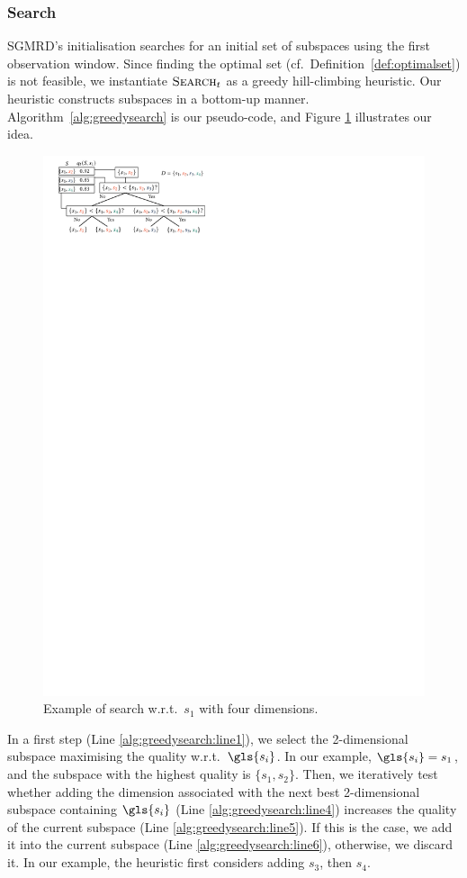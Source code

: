\subsubsection{Search}

{SGMRD}'s initialisation searches for an initial set of subspaces using the first observation window. Since finding the optimal set (cf.\ Definition~\ref{def:optimalset}) is not feasible, we instantiate $\textsc{Search}_t$ as a greedy hill-climbing heuristic. Our heuristic constructs subspaces in a bottom-up manner. 
Algorithm~\ref{alg:greedysearch} is our pseudo-code, and Figure \ref{fig:SGMRD_gmd} illustrates our idea.%

\begin{figure}
	\centering
	\includegraphics[width=0.7\linewidth]{part4-figures/SGMRD_gmd-compressed.pdf}
	\caption{Example of search w.r.t.\ $s_1$ with four dimensions.} 
	\label{fig:SGMRD_gmd}
\end{figure} 

In a first step (Line \ref{alg:greedysearch:line1}), we select the 2-dimensional subspace maximising the quality w.r.t.\ $\gls{s_i}$. In our example, $\gls{s_i} = s_1$, and the subspace with the highest quality is $\{s_1, s_2\}$. Then, we iteratively test whether adding the dimension associated with the next best 2-dimensional subspace containing $\gls{s_i}$ (Line \ref{alg:greedysearch:line4}) increases the quality of the current subspace (Line \ref{alg:greedysearch:line5}). If this is the case, we add it into the current subspace (Line \ref{alg:greedysearch:line6}), otherwise, we discard it. In our example, the heuristic first considers adding $s_3$, then $s_4$. 

